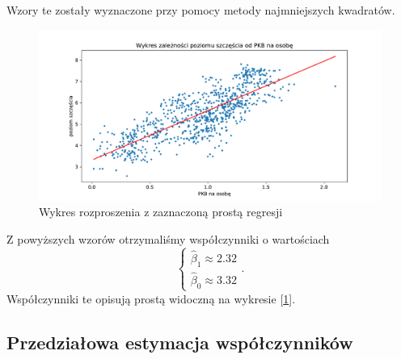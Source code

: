 \documentclass{article}
\theoremstyle{break}
\begin{document}
Wzory te zostały wyznaczone przy pomocy metody najmniejszych kwadratów.

\begin{figure}[H]
	\begin{center}
		\includegraphics[scale=0.43]{plot2.pdf}
		\caption{Wykres rozproszenia z zaznaczoną prostą regresji}
		\label{fig:prosta}
	\end{center}
\end{figure}

Z powyższych wzorów otrzymaliśmy współczynniki o wartościach
\begin{equation}
	\left\{ \begin{array}{ll}
		\hat{\beta}_{1} \approx 2.32\\
		\hat{\beta}_{0} \approx 3.32
	\end{array} \right..
\end{equation}
Współczynniki te opisują prostą widoczną na wykresie [\ref{fig:prosta}].

\subsection{Przedziałowa estymacja współczynników}
\end{document}

